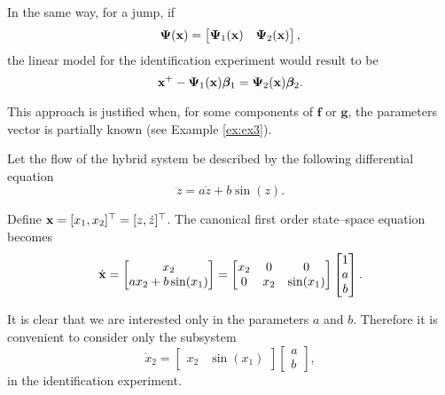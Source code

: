 In the same way, for a jump, if 
%
\begin{equation}
    \bm{\Psi}(\mathbf{x}) = \begin{bmatrix}\bm{\Psi}_1(\mathbf{x})&\bm{\Psi}_2(\mathbf{x})\end{bmatrix},
\end{equation}
%
the linear model for the identification experiment would result to be
%
\begin{equation}
    {\mathbf{x}}^+-\bm{\Psi}_1(\mathbf{x})\bm{\beta}_1=\bm{\Psi}_2(\mathbf{x})\bm{\beta}_2.
\end{equation}
%

This approach is justified when, for some components of $\mathbf{f}$ or $\mathbf{g}$, the parameters vector is partially known (see Example \ref{ex:ex3}).
%
\begin{exmp}\label{ex:ex2}
	Let the flow of the hybrid system be described by the following differential equation
	\begin{equation}
	    \ddot{z}=a\dot{z}+b\sin(z).
	\end{equation}
	
	Define $\mathbf{x} = [x_1,x_2]^\top=[z,\dot{z}]^\top$. The canonical first order state--space equation becomes
	\begin{equation}
		\dot{\mathbf{x}}=\begin{bmatrix}x_2\\ax_2+b\sin(x_1)\end{bmatrix}=\begin{bmatrix}x_2&0&0\\0&x_2&\sin(x_1)\end{bmatrix}\begin{bmatrix}1\\a\\b\end{bmatrix}.
	\end{equation}
	
	It is clear that we are interested only in the parameters $a$ and $b$. Therefore it is convenient to consider only the subsystem
	\begin{equation}
		\dot{x}_2=\begin{bmatrix}x_2&\sin(x_1)\end{bmatrix}\begin{bmatrix}a\\b\end{bmatrix},
	\end{equation}
	in the identification experiment.
\end{exmp}

